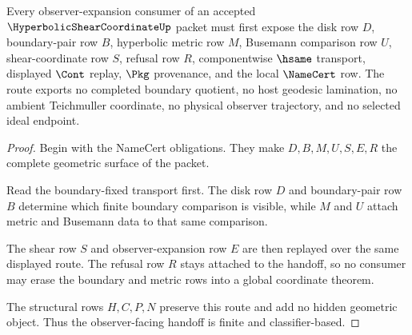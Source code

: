 \begin{theorem}
\label{thm:hyperbolic-shear-coordinate-observer-route}
Every observer-expansion consumer of an accepted $\HyperbolicShearCoordinateUp$ packet must first expose the disk row $D$, boundary-pair row $B$, hyperbolic metric row $M$, Busemann comparison row $U$, shear-coordinate row $S$, refusal row $R$, componentwise $\hsame$ transport, displayed $\Cont$ replay, $\Pkg$ provenance, and the local $\NameCert$ row. The route exports no completed boundary quotient, no host geodesic lamination, no ambient Teichmuller coordinate, no physical observer trajectory, and no selected ideal endpoint.
\end{theorem}
\begin{proof}
Begin with the NameCert obligations. They make $D,B,M,U,S,E,R$ the complete geometric surface of the packet.

Read the boundary-fixed transport first. The disk row $D$ and boundary-pair row $B$ determine which finite boundary comparison is visible, while $M$ and $U$ attach metric and Busemann data to that same comparison.

The shear row $S$ and observer-expansion row $E$ are then replayed over the same displayed route. The refusal row $R$ stays attached to the handoff, so no consumer may erase the boundary and metric rows into a global coordinate theorem.

The structural rows $H,C,P,N$ preserve this route and add no hidden geometric object. Thus the observer-facing handoff is finite and classifier-based.
\end{proof}



